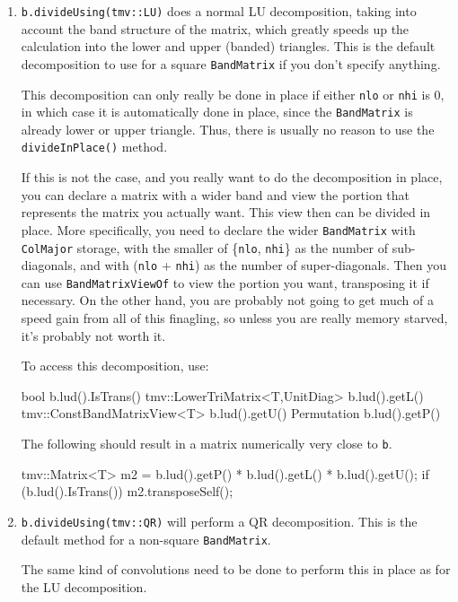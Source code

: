 \documentclass[twoside,letterpaper,11pt]{article}
\renewcommand{\tt}[1]{{\lstinline {#1}}}
\begin{document}
\begin{enumerate}
\item
\tt{b.divideUsing(tmv::LU)} does a normal LU decomposition,
taking into account the band structure of the matrix, which greatly speeds up 
the calculation into the lower and upper (banded) triangles.
This is the default decomposition to use for a square \tt{BandMatrix} 
if you don't specify anything.

This decomposition can only really
be done in place if either \tt{nlo} or \tt{nhi} is 0,
in which case it is automatically done in place,
since the \tt{BandMatrix} is already lower or upper triangle.
Thus, there is usually no reason to use the \tt{divideInPlace()} method.

If this is not the case, and you really want to do the decomposition in place, you can
declare a matrix with a wider band and view the portion that represents the matrix
you actually want.  This view then can be divided in place.  More specifically,
you need to declare the wider \tt{BandMatrix} with \tt{ColMajor} storage,
with the smaller of
\{\tt{nlo}, \tt{nhi}\} as the number of sub-diagonals, and with 
(\tt{nlo} + \tt{nhi}) as the number of super-diagonals.  
Then you can use \tt{BandMatrixViewOf} to view the portion you want, transposing it if
necessary.  On the other hand, you are probably not going to get much of a speed gain 
from all of this finagling, so unless you are really memory starved, it's probably not worth it.

To access this decomposition, use:
\begin{tmvcode}
bool b.lud().IsTrans()
tmv::LowerTriMatrix<T,UnitDiag> b.lud().getL()
tmv::ConstBandMatrixView<T> b.lud().getU()
Permutation b.lud().getP()
\end{tmvcode}
The following should result in a matrix numerically very close to \tt{b}.
\begin{tmvcode}
tmv::Matrix<T> m2 = b.lud().getP() * b.lud().getL() * b.lud().getU();
if (b.lud().IsTrans()) m2.transposeSelf();
\end{tmvcode}

\item
\tt{b.divideUsing(tmv::QR)} will perform a QR decomposition.  
This is the default method for a non-square \tt{BandMatrix}.

The same kind of convolutions need to be done to perform this in place as 
for the LU decomposition.


\end{enumerate}
\end{document}
